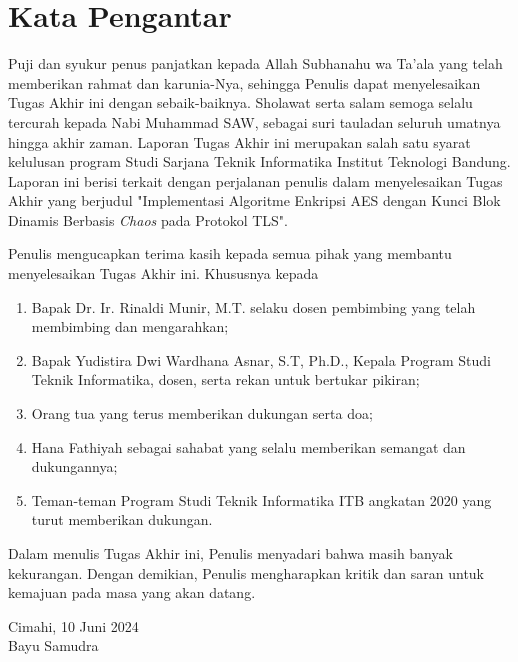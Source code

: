 \chapter*{Kata Pengantar}

Puji dan syukur penus panjatkan kepada Allah Subhanahu wa Ta'ala yang telah memberikan rahmat dan karunia-Nya, sehingga Penulis dapat menyelesaikan Tugas Akhir ini dengan sebaik-baiknya. Sholawat serta salam semoga selalu tercurah kepada Nabi Muhammad SAW, sebagai suri tauladan seluruh umatnya hingga akhir zaman. Laporan Tugas Akhir ini merupakan salah satu syarat kelulusan program Studi Sarjana Teknik Informatika Institut Teknologi Bandung. Laporan ini berisi terkait dengan perjalanan penulis dalam menyelesaikan Tugas Akhir yang berjudul "Implementasi Algoritme Enkripsi AES dengan Kunci Blok Dinamis Berbasis \emph{Chaos} pada Protokol TLS".

Penulis mengucapkan terima kasih kepada semua pihak yang membantu menyelesaikan Tugas Akhir ini. Khususnya kepada
\begin{enumerate}
  \item Bapak Dr. Ir. Rinaldi Munir, M.T. selaku dosen pembimbing yang telah membimbing dan mengarahkan;
  \item Bapak Yudistira Dwi Wardhana Asnar, S.T, Ph.D., Kepala Program Studi Teknik Informatika, dosen, serta rekan untuk bertukar pikiran;
  \item Orang tua yang terus memberikan dukungan serta doa;
  \item Hana Fathiyah sebagai sahabat yang selalu memberikan semangat dan dukungannya;
  \item Teman-teman Program Studi Teknik Informatika ITB angkatan 2020 yang turut memberikan dukungan.
\end{enumerate}

Dalam menulis Tugas Akhir ini, Penulis menyadari bahwa masih banyak kekurangan. Dengan demikian, Penulis mengharapkan kritik dan saran untuk kemajuan pada masa yang akan datang.

\begin{flushright}
  Cimahi, 10 Juni 2024 \\


  Bayu Samudra
\end{flushright}